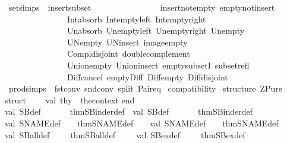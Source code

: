\begin{isabellebody}
\isanewline
\isanewline
\isanewline
{}\isamarkupfalse%
\ set{\isacharunderscore}simps\ {\isacharequal}\ insert{\isacharunderscore}subset\ \isanewline
\ \ \ \ \ \ \ \ \ \ \ \ \ \ \ insert{\isacharunderscore}not{\isacharunderscore}empty\ empty{\isacharunderscore}not{\isacharunderscore}insert\ \isanewline
\ \ \ \ \ \ \ \ \ \ \ \ \ \ \ Int{\isacharunderscore}absorb\ Int{\isacharunderscore}empty{\isacharunderscore}left\ Int{\isacharunderscore}empty{\isacharunderscore}right\isanewline
\ \ \ \ \ \ \ \ \ \ \ \ \ \ \ Un{\isacharunderscore}absorb\ Un{\isacharunderscore}empty{\isacharunderscore}left\ Un{\isacharunderscore}empty{\isacharunderscore}right\ Un{\isacharunderscore}empty\isanewline
\ \ \ \ \ \ \ \ \ \ \ \ \ \ \ UN{\isacharunderscore}empty\ UN{\isacharunderscore}insert\ image{\isacharunderscore}empty\isanewline
\ \ \ \ \ \ \ \ \ \ \ \ \ \ \ Compl{\isacharunderscore}disjoint\ double{\isacharunderscore}complement\isanewline
\ \ \ \ \ \ \ \ \ \ \ \ \ \ \ Union{\isacharunderscore}empty\ Union{\isacharunderscore}insert\ empty{\isacharunderscore}subsetI\ subset{\isacharunderscore}refl\isanewline
\ \ \ \ \ \ \ \ \ \ \ \ \ \ \ Diff{\isacharunderscore}cancel\ empty{\isacharunderscore}Diff\ Diff{\isacharunderscore}empty\ Diff{\isacharunderscore}disjoint\isanewline
\isanewline
{}\isamarkupfalse%
\ prod{\isacharunderscore}simps\ {\isacharequal}\ fst{\isacharunderscore}conv\ snd{\isacharunderscore}conv\ split\ Pair{\isacharunderscore}eq%
\isamarkuptrue%
%
\isadelimML
%
\endisadelimML
%
\isatagML
{}\isamarkupfalse%
{\isacharverbatimopen}\isanewline
{\isacharparenleft}{\isacharasterisk}\ compatibility{\isacharcolon}\ {\isacharasterisk}{\isacharparenright}\isanewline
structure\ ZPure\ {\isacharequal}\ \isanewline
struct\ \isanewline
\ \ \ val\ thy\ {\isacharequal}\ the{\isacharunderscore}context{\isacharparenleft}{\isacharparenright}\isanewline
end\isanewline
\isanewline
\isanewline
val\ SB{}{\isacharunderscore}def\ \ \ \ \ \ {\isacharequal}\ thm{\isachardoublequote}SBinder{}{\isacharunderscore}def{\isachardoublequote}\ \ val\ SB{\isacharunderscore}def\ \ \ \ \ \ {\isacharequal}\ thm{\isachardoublequote}SBinder{\isacharunderscore}def{\isachardoublequote}\isanewline
val\ SNAME{}{\isacharunderscore}def\ \ \ {\isacharequal}\ thm{\isachardoublequote}SNAME{}{\isacharunderscore}def{\isachardoublequote}\ \ \ \ val\ SNAME{\isacharunderscore}def\ \ \ {\isacharequal}\ thm{\isachardoublequote}SNAME{\isacharunderscore}def{\isachardoublequote}\isanewline
val\ SBall{\isacharunderscore}def\ \ \ \ {\isacharequal}\ thm{\isachardoublequote}SBall{\isacharunderscore}def{\isachardoublequote}\ \ \ \ \ val\ SBex{\isacharunderscore}def\ \ \ \ {\isacharequal}\ thm{\isachardoublequote}SBex{\isacharunderscore}def{\isachardoublequote}\isanewline

\end{isabellebody}
